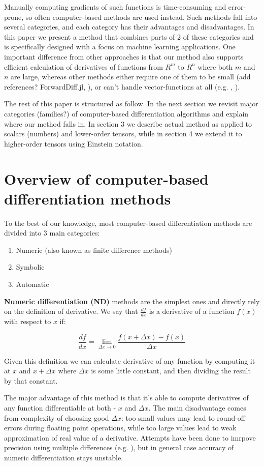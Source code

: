 \documentclass[conference]{IEEEtran}
\begin{document}
Manually computing gradients of such functions is time-consuming and
error-prone, so often computer-based methods are used instead. Such
methods fall into several categories, and each category has their
advantages and disadvantages. In this paper we present a method that
combines parts of 2 of these categories and is
specifically designed with a focus on machine learning
applications. One important difference from other approaches is that
our method also supports efficient calculation of derivatives of
functions from $R^m$ to $R^n$ where both $m$ and $n$ are large,
whereas other methods either require one of them to be small (add
references? ForwardDiff.jl, \cite{Stan}), or can't handle
vector-functions at all (e.g. \cite{Mathematica}, \cite{SymPy}).

The rest of this paper is structured as follow. In the next section we
revisit major categories (families?) of computer-based differentiation
algorithms and explain where our method falls in. In section 3 we
describe actual method as applied to scalars (numbers) and lower-order
tensors, while in section 4 we extend it to higher-order tensors using
Einstein notation.


\section{Overview of computer-based differentiation methods}

To the best of our knowledge, most computer-based differentiation
methods are divided into 3 main categories:

\begin{enumerate}
\item Numeric (also known as finite difference methods)
\item Symbolic
\item Automatic
\end{enumerate}


\textbf{Numeric differentiation (ND)} methods are the simplest ones
and directly rely on the definition of derivative. We say that
$\frac{df}{dx}$ is a derivative of a function $f(x)$ with respect to
$x$ if:

$$\frac{df}{dx} = \lim_{\Delta x \to 0} \frac{f(x + \Delta x) - f(x)}{\Delta x}$$

Given this definition we can calculate derivative of any function by
computing it at $x$ and $x + \Delta x$ where $\Delta x$ is some little
constant, and then dividing the result by that constant.

The major advantage of this method is that it's able to compute
derivatives of any function differentiable at both - $x$ and
$\Delta x$. The main disadvantage comes from complexity of choosing
good $\Delta x$: too small values may lead to round-off errors during
floating point operations, while too large values lead to weak
approximation of real value of a derivative. Attempts have been done
to imrpove precision using multiple differences
(e.g. \cite{fornberg1988}), but in general case accuracy of numeric
differentiation stays unstable.
\end{document}
